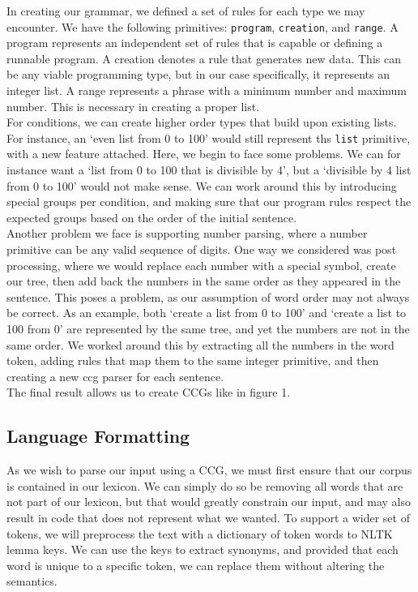 \documentclass[11pt,letterpaper]{article}
\begin{document}
In creating our grammar, we defined a set of rules for each type we may encounter. 
We have the following primitives: {\small\verb|program|}, {\small\verb|creation|}, and {\small\verb|range|}.
A program represents an independent set of rules that is capable or defining a runnable program.
A creation denotes a rule that generates new data. 
This can be any viable programming type, but in our case specifically, it represents an integer list.
A range represents a phrase with a minimum number and maximum number.
This is necessary in creating a proper list.\\

For conditions, we can create higher order types that build upon existing lists.
For instance, an `even list from 0 to 100' would still represent ths {\small\verb|list|} primitive, with a new feature attached.
Here, we begin to face some problems.
We can for instance want a `list from 0 to 100 that is divisible by 4', but a `divisible by 4 list from 0 to 100' would not make sense.
We can work around this by introducing special groups per condition, and making sure that our program rules respect the expected groups based on the order of the initial sentence.\\

Another problem we face is supporting number parsing, where a number primitive can be any valid sequence of digits. 
One way we considered was post processing, where we would replace each number with a special symbol, create our tree, then add back the numbers in the same order as they appeared in the sentence.
This poses a problem, as our assumption of word order may not always be correct. As an example, both `create a list from 0 to 100' and `create a list to 100 from 0' are represented by the same tree, and yet the numbers are not in the same order.
We worked around this by extracting all the numbers in the word token, adding rules that map them to the same integer primitive, and then creating a new ccg parser for each sentence.\\

The final result allows us to create CCGs like in figure 1.
\subsection{Language Formatting}

As we wish to parse our input using a CCG, we must first ensure that our corpus is contained in our lexicon.
We can simply do so be removing all words that are not part of our lexicon, but that would greatly constrain our input, and may also result in code that does not represent what we wanted.
To support a wider set of tokens, we will preprocess the text with a dictionary of token words to NLTK lemma keys.
We can use the keys to extract synonyms, and provided that each word is unique to a specific token, we can replace them without altering the semantics.
\end{document}
